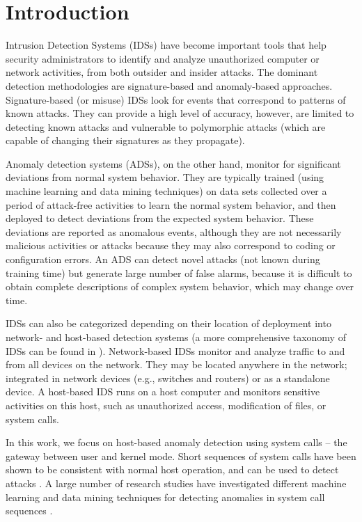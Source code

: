 \chapter{Introduction} \label{chapter1}


Intrusion Detection Systems (IDSs) have become important tools that help security administrators to identify and analyze unauthorized computer or network activities, from both outsider and insider attacks.
The dominant detection methodologies are signature-based and anomaly-based approaches.
Signature-based (or misuse) IDSs look for events that correspond to patterns of known attacks.
They can provide a high level of accuracy, however, are limited to detecting known attacks and vulnerable to polymorphic attacks (which are capable of changing their signatures as they propagate).

Anomaly detection systems (ADSs), on the other hand, monitor for significant deviations from normal system behavior.
They are typically trained (using machine learning and data mining techniques) on data sets collected over a period of attack-free activities to learn the normal system behavior, and then deployed to detect deviations from the expected system behavior.
These deviations are reported as anomalous events, although they are not necessarily malicious activities or attacks because they may also correspond to coding or configuration errors.
An ADS can detect novel attacks (not known during training time) but generate large number of false alarms, because it is difficult to obtain complete descriptions of complex system behavior, which may change over time.

IDSs can also be categorized depending on their location of deployment into network- and host-based detection systems (a more comprehensive taxonomy of IDSs can be found in \cite{Liao2013}).
Network-based IDSs monitor and analyze traffic to and from all devices on the network.
They may be located anywhere in the network; integrated in network devices (e.g., switches and routers) or as a standalone device.
A host-based IDS runs on a host computer and monitors sensitive activities on this host, such as unauthorized access, modification of files, or system calls.

In this work, we focus on host-based anomaly detection using system calls -- the gateway between user and kernel mode.
Short sequences of system calls have been shown to be consistent with normal host operation, and can be used to detect attacks \cite{Forrest1996,Warrender1999}.
A large number of research studies have investigated different machine learning and data mining techniques for detecting anomalies in system call sequences \cite{Forrest2008, Creech2014, Yolacan2014, Warrender1999}.

